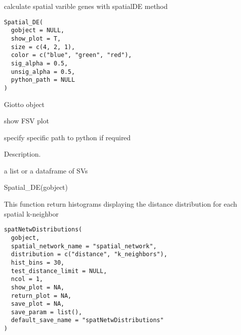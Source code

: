 \documentclass[a4paper]{book}
\begin{document}
%
\begin{Description}\relax
calculate spatial varible genes with spatialDE method
\end{Description}
%
\begin{Usage}
\begin{verbatim}
Spatial_DE(
  gobject = NULL,
  show_plot = T,
  size = c(4, 2, 1),
  color = c("blue", "green", "red"),
  sig_alpha = 0.5,
  unsig_alpha = 0.5,
  python_path = NULL
)
\end{verbatim}
\end{Usage}
%
\begin{Arguments}
\begin{ldescription}
\item[\code{gobject}] Giotto object

\item[\code{show\_plot}] show FSV plot

\item[\code{python\_path}] specify specific path to python if required
\end{ldescription}
\end{Arguments}
%
\begin{Details}\relax
Description.
\end{Details}
%
\begin{Value}
a list or a dataframe of SVs
\end{Value}
%
\begin{Examples}
\begin{ExampleCode}
    Spatial_DE(gobject)
\end{ExampleCode}
\end{Examples}
%
\begin{Description}\relax
This function return histograms displaying the distance distribution for each spatial k-neighbor
\end{Description}
%
\begin{Usage}
\begin{verbatim}
spatNetwDistributions(
  gobject,
  spatial_network_name = "spatial_network",
  distribution = c("distance", "k_neighbors"),
  hist_bins = 30,
  test_distance_limit = NULL,
  ncol = 1,
  show_plot = NA,
  return_plot = NA,
  save_plot = NA,
  save_param = list(),
  default_save_name = "spatNetwDistributions"
)
\end{verbatim}
\end{Usage}
\end{document}

